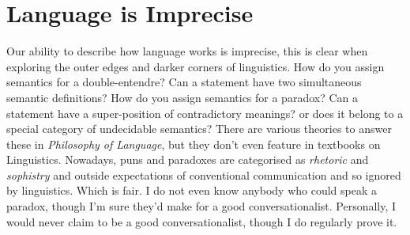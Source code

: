 \section{Language is Imprecise}
Our ability to describe how language works is imprecise, this is clear when exploring the outer edges and darker corners of linguistics. How do you assign semantics for a double-entendre? Can a statement have two simultaneous semantic definitions? How do you assign semantics for a paradox? Can a statement have a super-position of contradictory meanings? or does it belong to a special category of undecidable semantics? There are various theories to answer these in \textit{Philosophy of Language}, but they don't even feature in textbooks on Linguistics. Nowadays, puns and paradoxes are categorised as \textit{rhetoric} and \textit{sophistry} and outside expectations of conventional communication and so ignored by linguistics. Which is fair. I do not even know anybody who could speak a paradox, though I'm sure they'd make for a good conversationalist. Personally, I would never claim to be a good conversationalist, though I do regularly prove it.



